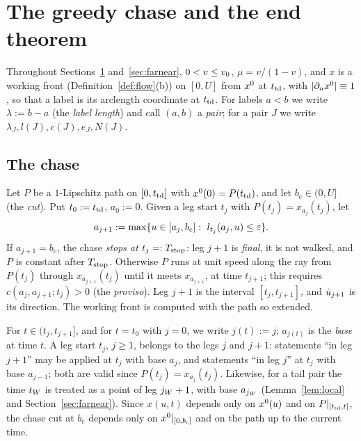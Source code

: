 \section{The greedy chase and the end theorem}\label{sec:end}

Throughout Sections~\ref{sec:end} and~\ref{sec:farnear}, $0<v\le v_0$, $\mu=v/(1-v)$, and $x$ is a working front
(Definition~\ref{def:flow}(b)) on $[0,U]$ from $x^0$ at $t_{\mathrm{td}}$, with $|\partial_ux^0|\equiv1$, so that a label is its arclength
coordinate at $t_{\mathrm{td}}$. For labels $a<b$ we write $\lambda:=b-a$ (the \emph{label length}) and call $(a,b)$ a \emph{pair}; for a pair
$J$ we write $\lambda_J,l(J),c(J),e_J,N(J)$.

\subsection{The chase}

\begin{definition}\label{def:chase}
Let $P$ be a $1$-Lipschitz path on $[0,t_{\mathrm{td}}]$ with $x^0(0)=P(t_{\mathrm{td}})$, and let $b_{\mathrm c}\in(0,U]$ (the \emph{cut}). Put
$t_0:=t_{\mathrm{td}}$, $a_0:=0$. Given a leg start $t_j$ with $P(t_j)=x_{a_j}(t_j)$, let
\[
a_{j+1}:=\max\{u\in[a_j,b_{\mathrm c}]:\ l_{t_j}(a_j,u)\le\varepsilon\}.
\]
If $a_{j+1}=b_{\mathrm c}$, the chase \emph{stops at} $t_j=:T_{\mathrm{stop}}$: leg $j+1$ is \emph{final}, it is not walked, and $P$ is
constant after $T_{\mathrm{stop}}$. Otherwise $P$ runs at unit speed along the ray from $P(t_j)$ through $x_{a_{j+1}}(t_j)$ until it meets
$x_{a_{j+1}}$, at time $t_{j+1}$; this requires $c(a_j,a_{j+1};t_j)>0$ (the \emph{proviso}). Leg $j+1$ is the interval
$[t_j,t_{j+1}]$, and $\hat u_{j+1}$ is its direction. The working front is computed with the path so extended.
\end{definition}

For $t\in(t_j,t_{j+1}]$, and for $t=t_0$ with $j=0$, we write $j(t):=j$; $a_{j(t)}$ is the \emph{base} at time $t$. A leg start
$t_j$, $j\ge1$, belongs to the legs $j$ and $j+1$: statements ``in leg $j+1$'' may be applied at $t_j$ with base $a_j$, and
statements ``in leg $j$'' at $t_j$ with base $a_{j-1}$; both are valid since $P(t_j)=x_{a_j}(t_j)$. Likewise, for a tail pair the
time $t_W$ is treated as a point of leg $j_W+1$, with base $a_{j_W}$ (Lemma~\ref{lem:local} and Section~\ref{sec:farnear}). Since $x(u,t)$ depends only on $x^0(u)$ and on $P|_{[t_{\mathrm{td}},t]}$, the chase cut at
$b_{\mathrm c}$ depends only on $x^0|_{[0,b_{\mathrm c}]}$ and on the path up to the current time.

